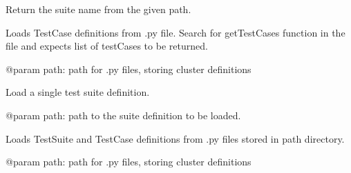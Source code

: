 \documentclass[a4paper,11pt,openany]{sphinxmanual}
\begin{document}

\begin{fulllineitems}
\label{ref-manual/XrdTest:XrdTest.TestUtils.extractSuiteName}
Return the suite name from the given path.

\end{fulllineitems}


\begin{fulllineitems}
\label{ref-manual/XrdTest:XrdTest.TestUtils.loadTestCasesDefs}
Loads TestCase definitions from .py file. Search for getTestCases function
in the file and expects list of testCases to be returned.

@param path: path for .py files, storing cluster definitions

\end{fulllineitems}


\begin{fulllineitems}
\label{ref-manual/XrdTest:XrdTest.TestUtils.loadTestSuiteDef}
Load a single test suite definition.

@param path: path to the suite definition to be loaded.

\end{fulllineitems}


\begin{fulllineitems}
\label{ref-manual/XrdTest:XrdTest.TestUtils.loadTestSuiteDefs}
Loads TestSuite and TestCase definitions from .py files
stored in path directory.

@param path: path for .py files, storing cluster definitions

\end{fulllineitems}


\begin{fulllineitems}
\label{ref-manual/XrdTest:XrdTest.TestUtils.readFile}
\end{fulllineitems}
\end{document}
